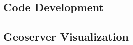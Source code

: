 \subsection{Code Development}
\label{sec:PreAggregateDev}

\pagebreak

\subsection{Geoserver Visualization}
\label{sec:visualization}

\pagebreak

%
